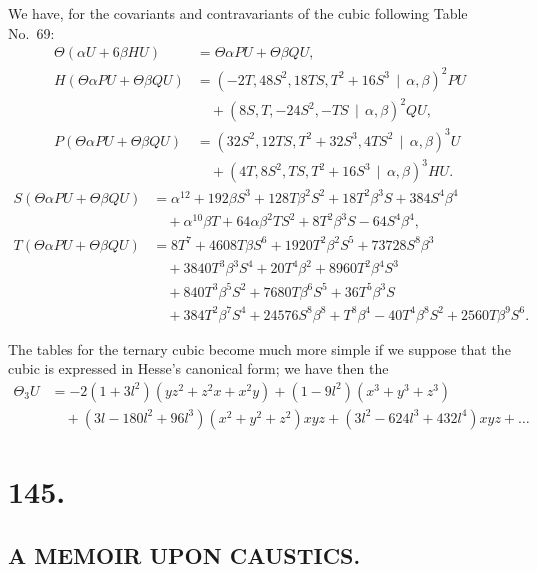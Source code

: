 \documentclass[11pt,a4paper]{book}
\begin{document}
\begin{center}
We have, for the covariants and contravariants of the cubic following Table No.~69:
\begin{align*}
\Theta(\alpha U + 6\beta HU) &= \Theta\alpha PU + \Theta\beta QU,\\
H(\Theta\alpha PU + \Theta\beta QU) &= (-2T, 48S^2, 18TS, T^2 + 16S^3 \, \mid\, \alpha, \beta)^2 PU\\
&\quad + (8S, T, -24S^2, -TS \, \mid\, \alpha, \beta)^2 QU,\\
P(\Theta\alpha PU + \Theta\beta QU) &= (32S^2, 12TS, T^2 + 32S^3, 4TS^2 \, \mid\, \alpha, \beta)^3 U\\
&\quad + (4T, 8S^2, TS, T^2 + 16S^3 \, \mid\, \alpha, \beta)^3 HU.
\end{align*}
\begin{align*}
S(\Theta\alpha PU + \Theta\beta QU) &= \alpha^{12} + 192\beta S^3 + 128T\beta^2S^2 + 18T^2\beta^3S + 384S^4\beta^4\\
&\quad + \alpha^{10}\beta T + 64\alpha\beta^2TS^2 + 8T^2\beta^3S - 64S^4\beta^4,\\
T(\Theta\alpha PU + \Theta\beta QU) &= 8T^7 + 4608T\beta S^6 + 1920T^2\beta^2S^5 + 73728S^8\beta^3\\
&\quad + 3840T^3\beta^3S^4 + 20T^4\beta^2 + 8960T^2\beta^4S^3\\
&\quad + 840T^3\beta^5S^2 + 7680T\beta^6S^5 + 36T^5\beta^3S\\
&\quad + 384T^2\beta^7S^4 + 24576S^8\beta^8 + T^8\beta^4 - 40T^4\beta^8S^2 + 2560T\beta^9S^6.
\end{align*}

The tables for the ternary cubic become much more simple if we suppose that
the cubic is expressed in Hesse's canonical form; we have then the
\begin{align*}
\Theta_3 U &= -2(1 + 3l^2)(yz^2 + z^2x + x^2y) + (1 - 9l^2)(x^3 + y^3 + z^3)\\
&\quad + (3l - 180l^2 + 96l^3)(x^2 + y^2 + z^2)xyz + (3l^2 - 624l^3 + 432l^4)xyz + \ldots
\end{align*}

\clearpage
\section*{145.}
\subsection*{A MEMOIR UPON CAUSTICS.}


\end{center}
\end{document}
